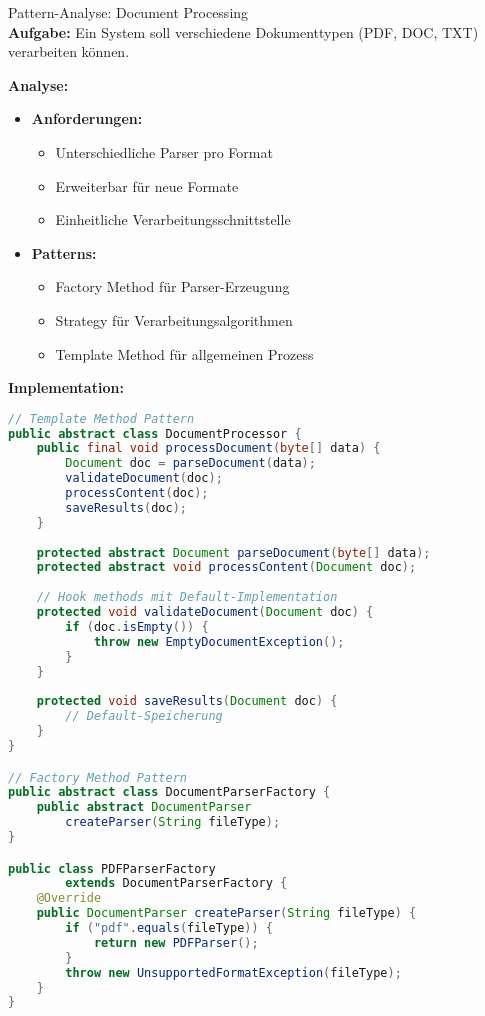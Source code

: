 \begin{example2}{Pattern-Analyse: Document Processing}\\
\textbf{Aufgabe:} Ein System soll verschiedene Dokumenttypen (PDF, DOC, TXT) verarbeiten können.

\textbf{Analyse:}
\begin{itemize}
    \item \textbf{Anforderungen:}
    \begin{itemize}
        \item Unterschiedliche Parser pro Format
        \item Erweiterbar für neue Formate
        \item Einheitliche Verarbeitungsschnittstelle
    \end{itemize}
    
    \item \textbf{Patterns:}
    \begin{itemize}
        \item Factory Method für Parser-Erzeugung
        \item Strategy für Verarbeitungsalgorithmen
        \item Template Method für allgemeinen Prozess
    \end{itemize}
\end{itemize}

\textbf{Implementation:}
\begin{lstlisting}[language=Java, style=basesmol]
// Template Method Pattern
public abstract class DocumentProcessor {
    public final void processDocument(byte[] data) {
        Document doc = parseDocument(data);
        validateDocument(doc);
        processContent(doc);
        saveResults(doc);
    }
    
    protected abstract Document parseDocument(byte[] data);
    protected abstract void processContent(Document doc);
    
    // Hook methods mit Default-Implementation
    protected void validateDocument(Document doc) {
        if (doc.isEmpty()) {
            throw new EmptyDocumentException();
        }
    }
    
    protected void saveResults(Document doc) {
        // Default-Speicherung
    }
}

// Factory Method Pattern
public abstract class DocumentParserFactory {
    public abstract DocumentParser 
        createParser(String fileType);
}

public class PDFParserFactory 
        extends DocumentParserFactory {
    @Override
    public DocumentParser createParser(String fileType) {
        if ("pdf".equals(fileType)) {
            return new PDFParser();
        }
        throw new UnsupportedFormatException(fileType);
    }
}


\end{lstlisting}
\end{example2}
